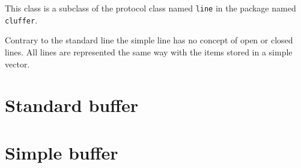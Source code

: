 
This class is a subclass of the protocol class named \texttt{line} in
the package named \texttt{cluffer}.

Contrary to the standard line  the simple
line has no concept of open or closed lines.  All lines are
represented the same way with the items stored in a simple
\commonlisp{} vector.

\section{Standard buffer}

\section{Simple buffer}
